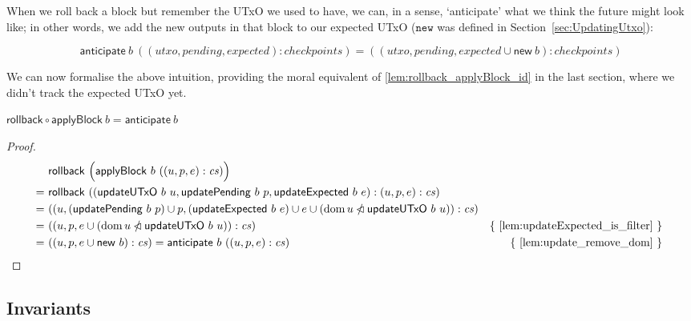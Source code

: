 \documentclass{article}
\newcommand{\restrictdom}{\lhd}
\newcommand{\subtractdom}{\mathbin{\slashed{\restrictdom}}}
\DeclareMathOperator{\dom}{dom}
\theoremstyle{definition}{
  \newtheorem{lemma}{Lemma}[section] %
  \newtheorem{definition}[lemma]{Definition}
}
\theoremstyle{theorem}{
  \newtheorem{invariant}[lemma]{Invariant}
  \newtheorem{proofobligation}[lemma]{Proof Obligation}
}
\numberwithin{equation}{lemma}
\begin{document}
When we roll back a block but remember the UTxO we used to have, we can, in a
sense, `anticipate' what we think the future might look like; in other words, we
add the new outputs in that block to our expected UTxO ($\mathtt{new}$ was
defined in Section~\ref{sec:UpdatingUtxo}):

\begin{definition}
\begin{equation*}
  \mathsf{anticipate} ~ b ~ ((\mathit{utxo}, \mathit{pending}, \mathit{expected}) : \mathit{checkpoints})
= ((\mathit{utxo}, \mathit{pending}, \mathit{expected} \cup \mathsf{new} ~ b) : \mathit{checkpoints})
\end{equation*}
\end{definition}

We can now formalise the above intuition, providing the moral equivalent
of \cref{lem:rollback_applyBlock_id} in the last section, where we didn't
track the expected UTxO yet.

\begin{lemma}
\begin{math}
  \mathsf{rollback} \circ \mathsf{applyBlock} ~ b = \mathsf{anticipate} ~ b
\end{math}
\end{lemma}

\begin{proof}
\begin{align*}
  & ~ \mathsf{rollback} ~ \Bigl( \mathsf{applyBlock} ~ b ~ ((u, p, e) : \mathit{cs}) \Bigr) \\
= & ~ \mathsf{rollback} ~ ((\mathsf{updateUTxO} ~ b ~ u, \mathsf{updatePending} ~ b ~ p, \mathsf{updateExpected} ~ b ~ e) : (u, p, e) : \mathit{cs}) \\
= & ~ ((u, (\mathsf{updatePending} ~ b ~ p) \cup p,  (\mathsf{updateExpected} ~ b ~ e) \cup e \cup (\dom u \subtractdom \mathsf{updateUTxO} ~ b ~ u)) : \mathit{cs}) \\
= & ~ ((u, p, e \cup (\dom u \subtractdom \mathsf{updateUTxO} ~ b ~ u)) : \mathit{cs}) & \text{\{ \cref{lem:updateExpected_is_filter} \} } \\
= & ~ ((u, p, e \cup \mathsf{new} ~ b) : \mathit{cs}) = \mathsf{anticipate} ~ b ~ ((u, p, e) : \mathit{cs}) & \text{\{ \cref{lem:update_remove_dom} \} }
\end{align*}
\end{proof}

\subsection{Invariants}
\end{document}
